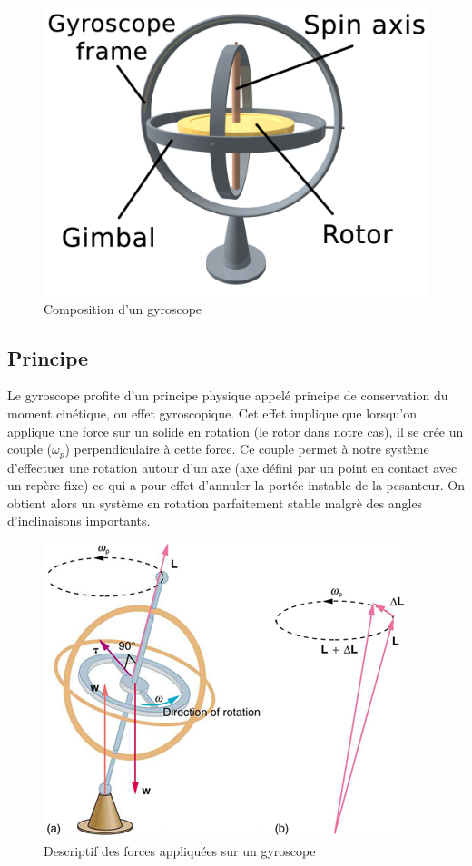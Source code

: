 \documentclass[a4paper,10pt]{report}
\begin{document}
	  \begin{figure}[htbp]
	    \centering
	    \includegraphics[scale = 0.1]{img/3D_Gyroscope.png}
	    \caption{Composition d'un gyroscope}
	    \label{compositiongyroscope}
	  \end{figure}
	  
	\subsection{Principe}
	  Le gyroscope profite d'un principe physique appelé principe de 
conservation du moment cinétique, ou effet gyroscopique. Cet effet implique que 
lorsqu'on applique une force sur un solide en rotation (le rotor dans notre 
cas), il se crée un couple ($\omega_{p}$) perpendiculaire à cette force. Ce 
couple permet à notre système d'effectuer une rotation autour d'un axe (axe 
défini par un point en contact avec un repère fixe) ce qui a pour effet 
d'annuler la portée instable de la pesanteur. On obtient alors un système en 
rotation parfaitement stable malgrè des angles d'inclinaisons importants.

	  \begin{figure}[htbp]
	    \centering
	    \includegraphics[scale = 1.3]{img/schema_gyro.png}
	    \caption{Descriptif des forces appliquées sur un gyroscope}
	    \label{descriptifforces}
	  \end{figure}
	  
\end{document}
